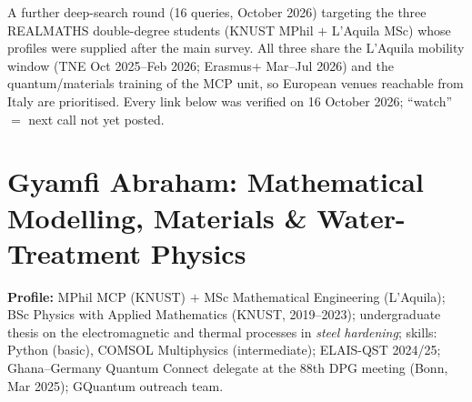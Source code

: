 \documentclass[11pt,a4paper]{article}
\begin{document}
\noindent A further deep-search round (16 queries, October 2026) targeting the three REALMATHS double-degree students (KNUST MPhil $+$ L'Aquila MSc) whose profiles were supplied after the main survey. All three share the L'Aquila mobility window (TNE Oct 2025--Feb 2026; Erasmus+ Mar--Jul 2026) and the quantum/materials training of the MCP unit, so European venues reachable from Italy are prioritised. Every link below was verified on 16 October 2026; ``watch'' $=$ next call not yet posted.

\section{Gyamfi Abraham: Mathematical Modelling, Materials \& Water-Treatment Physics}

\noindent \textbf{Profile:} MPhil MCP (KNUST) $+$ MSc Mathematical Engineering (L'Aquila); BSc Physics with Applied Mathematics (KNUST, 2019--2023); undergraduate thesis on the electromagnetic and thermal processes in \emph{steel hardening}; skills: Python (basic), COMSOL Multiphysics (intermediate); ELAIS-QST 2024/25; Ghana--Germany Quantum Connect delegate at the 88th DPG meeting (Bonn, Mar 2025); GQuantum outreach team.
\end{document}
